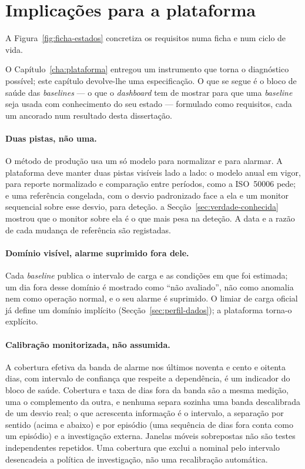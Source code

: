\section{Implicações para a plataforma}
\label{sec:implicacoes-plataforma}
A Figura~\ref{fig:ficha-estados} concretiza os requisitos numa ficha e num ciclo de vida.



O Capítulo~\ref{cha:plataforma} entregou um instrumento que torna o
diagnóstico possível; este capítulo devolve-lhe uma especificação. O que se
segue é o bloco de saúde das \emph{baselines} --- o que o \emph{dashboard}
tem de mostrar para que uma \emph{baseline} seja usada com conhecimento do
seu estado --- formulado como requisitos, cada um ancorado num resultado
desta dissertação.

\paragraph{Duas pistas, não uma.} O método de produção usa um só modelo para
normalizar e para alarmar. A plataforma deve manter duas pistas visíveis
lado a lado: o modelo anual em vigor, para reporte normalizado e comparação
entre períodos, como a ISO~50006 pede; e uma referência congelada, com o
desvio padronizado face a ela e um monitor sequencial sobre esse desvio,
para deteção.  a Secção~\ref{sec:verdade-conhecida} mostrou que o monitor
sobre ela é o que mais pesa na deteção. A data e a razão de cada mudança de
referência são registadas.

\paragraph{Domínio visível, alarme suprimido fora dele.} Cada
\emph{baseline} publica o intervalo de carga e as condições em que foi
estimada; um dia fora desse domínio é mostrado como ``não avaliado'', não
como anomalia nem como operação normal, e o seu alarme é suprimido. O limiar de carga oficial já
define um domínio implícito (Secção~\ref{sec:perfil-dados}); a plataforma
torna-o explícito.

\paragraph{Calibração monitorizada, não assumida.} A cobertura efetiva da
banda de alarme nos últimos noventa e cento e oitenta dias, com intervalo de
confiança que respeite a dependência, é um indicador do bloco de saúde.
Cobertura e taxa de dias fora da banda são a mesma medição, uma o
complemento da outra, e nenhuma separa sozinha uma banda descalibrada de um
desvio real; o que acrescenta informação é o intervalo, a separação por
sentido (acima e abaixo) e por episódio (uma sequência de dias fora conta
como um episódio) e a investigação externa. Janelas móveis sobrepostas não
são testes independentes repetidos. Uma cobertura
que exclui a nominal pelo intervalo desencadeia a política de investigação,
não uma recalibração automática.

